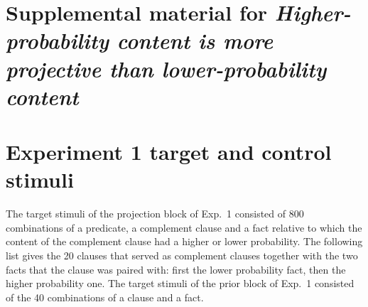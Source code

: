 \documentclass[11pt,fleqn]{article}
\newcommand{\6}{\mbox{$[\hspace*{-.6mm}[$}}
\newcommand{\9}{\mbox{$]\hspace*{-.6mm}]$}}
\begin{document}
\newpage

\appendix

\setcounter{table}{0}
\renewcommand{\thetable}{A\arabic{table}}

\setcounter{figure}{0}
\renewcommand{\thefigure}{A\arabic{figure}}

\section*{Supplemental material for {\em Higher-probability content is more projective than lower-probability content}}

\section{Experiment 1 target and control stimuli}\label{a-stim}

The target stimuli of the projection block of Exp.~1 consisted of 800 combinations of a predicate, a complement clause and a fact relative to which the content of the complement clause had a higher or lower probability. The following list gives the 20 clauses that served as complement clauses together with the two facts that the clause was paired with: first the lower probability fact, then the higher probability one. The target stimuli of the prior block of Exp.~1 consisted of the 40 combinations of a clause and a fact.
\end{document}
